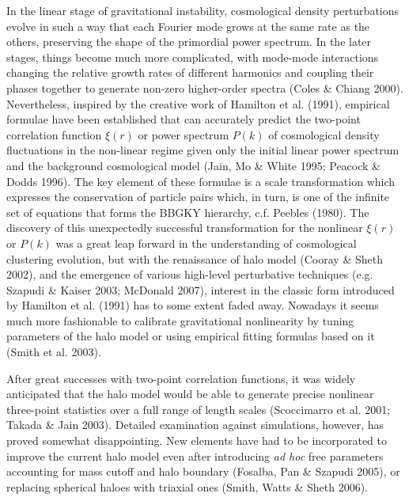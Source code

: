 \documentclass[]{mn2e}
\begin{document}
In the linear stage of gravitational instability, cosmological
density perturbations evolve in such a way that each Fourier mode
grows at the same rate as the others, preserving the shape of the
primordial power spectrum. In the later stages, things become much
more complicated, with mode-mode interactions changing the relative
growth rates of different harmonics and coupling their phases
together to generate non-zero higher-order spectra (Coles \& Chiang
2000). Nevertheless, inspired by the creative work of Hamilton et
al. (1991), empirical formulae have been established that can
accurately predict the two-point correlation function $\xi(r)$ or
power spectrum $P(k)$ of cosmological density fluctuations in the
non-linear regime given only the initial linear power spectrum and
the background cosmological model (Jain, Mo \& White 1995; Peacock
\& Dodds 1996). The key element of these formulae is a scale
transformation which expresses the conservation of particle pairs
which, in turn, is one of the infinite set of equations that forms
the BBGKY hierarchy, c.f. Peebles (1980). The discovery of this
unexpectedly successful transformation for the nonlinear $\xi(r)$ or
$P(k)$ was a great leap forward in the understanding of cosmological
clustering evolution, but with the renaissance of halo model (Cooray
\& Sheth 2002), and the emergence of various high-level perturbative
techniques (e.g. Szapudi \& Kaiser 2003;  McDonald 2007), interest
in the classic form introduced by Hamilton et al. (1991) has to some
extent faded away. Nowadays it seems much more fashionable to
calibrate gravitational nonlinearity by tuning parameters of the
halo model or using empirical fitting formulas based on it (Smith et
al. 2003).

After great successes with two-point correlation functions, it was
widely anticipated that the halo model would be able to generate
precise nonlinear three-point statistics over a full range of length
scales (Scoccimarro et al. 2001; Takada \& Jain 2003). Detailed
examination against simulations, however, has proved somewhat
disappointing. New elements have had to be incorporated to improve
the current halo model even after introducing {\em ad hoc} free
parameters accounting for mass cutoff and halo boundary (Fosalba,
Pan \& Szapudi 2005), or replacing spherical haloes with triaxial
ones (Smith, Watts \& Sheth 2006).
\end{document}

